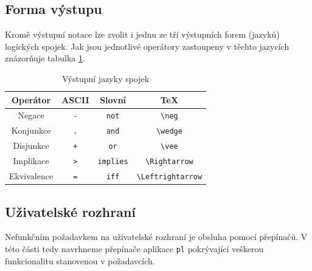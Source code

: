 \documentclass[thesis=B,czech,hidelinks]{thesis}[2012/06/26]
\begin{document}
\subsection{Forma výstupu}

Kromě výstupní notace lze zvolit i jednu ze tří výstupních forem (jazyků) logických spojek. Jak jsou jednotlivé operátory zastoupeny v těchto jazycích znázorňuje tabulka \ref{tab:connectives_language}.

\begin{table}
\centering
\caption{Výstupní jazyky spojek}
\label{tab:connectives_language}
\begin{tabular}{|c||c|c|c|}\hline
Operátor & ASCII & Slovní & \TeX \tabularnewline \hline \hline
Negace & \verb|-| & \verb|not| & \verb|\neg| \tabularnewline \hline
Konjunkce & \verb|.| & \verb|and| & \verb|\wedge| \tabularnewline \hline
Disjunkce & \verb|+| & \verb|or| & \verb|\vee| \tabularnewline \hline
Implikace & \verb|>| & \verb|implies| & \verb|\Rightarrow| \tabularnewline \hline
Ekvivalence & \verb|=| & \verb|iff| & \verb|\Leftrightarrow| \tabularnewline \hline
\end{tabular}
\end{table}

\subsection{Uživatelské rozhraní}

Nefunkčním požadavkem na uživatelské rozhraní je obsluha pomocí přepínačů. V této části tedy navrhneme přepínače aplikace \texttt{pl} pokrývající veškerou funkcionalitu stanovenou v požadavcích. 
\end{document}
